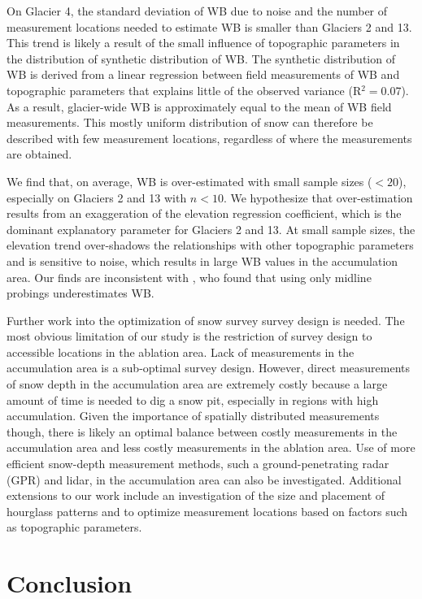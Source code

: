 \documentclass[twocolumn,letterpaper]{igs}
\begin{document}
On Glacier 4, the standard deviation of WB due to noise and the number of measurement locations needed to estimate WB is smaller than Glaciers 2 and 13. This trend is likely a result of the small influence of topographic parameters in the distribution of synthetic distribution of WB. The synthetic distribution of WB is derived from a linear regression between field measurements of WB and topographic parameters that explains little of the observed variance (R$^2=$0.07). As a result, glacier-wide WB is approximately equal to the mean of WB field measurements. This mostly uniform distribution of snow can therefore be described with few measurement locations, regardless of where the measurements are obtained. 

We find that, on average, WB is over-estimated with small sample sizes ($<20$), especially on Glaciers 2 and 13 with $n<10$. We hypothesize that over-estimation results from an exaggeration of the elevation regression coefficient, which is the dominant explanatory parameter for Glaciers 2 and 13. At small sample sizes, the elevation trend over-shadows the relationships with other topographic parameters and is sensitive to noise, which results in large WB values in the accumulation area. Our finds are inconsistent with \cite{Walmsley2015}, who found that using only midline probings underestimates WB.

Further work into the optimization of snow survey survey design is needed. The most obvious limitation of our study is the restriction of survey design to accessible locations in the ablation area. Lack of measurements in the accumulation area is a sub-optimal survey design. However, direct measurements of snow depth in the accumulation area are extremely costly because a large amount of time is needed to dig a snow pit, especially in regions with high accumulation. Given the importance of spatially distributed measurements though, there is likely an optimal balance between costly measurements in the accumulation area and less costly measurements in the ablation area. Use of more efficient snow-depth measurement methods, such a ground-penetrating radar (GPR) and lidar, in the accumulation area can also be investigated. Additional extensions to our work include an investigation of the size and placement of hourglass patterns and to optimize measurement locations based on factors such as topographic parameters. 


\section{Conclusion}
\end{document}
